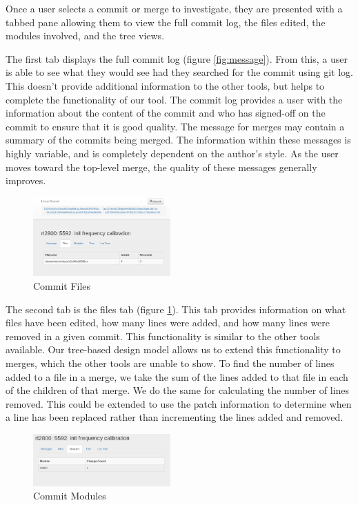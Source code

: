 \documentclass[conference, draftclsnofoot, draft]{IEEEtran}
\begin{document}
Once a user selects a commit or merge to investigate, they are presented with a
tabbed pane allowing them to view the full commit log, the files edited, the modules
involved, and the tree views.

The first tab displays the full commit log (figure \ref{fig:message}). From this, a
user is able to see what they would see had they searched for the commit using git
log. This doesn't provide additional information to the other tools, but helps to
complete the functionality of our tool. The commit log provides a user with the
information about the content of the commit and who has signed-off on the commit to
ensure that it is good quality. The message for merges may contain a summary of the
commits being merged.  The information within these messages is highly variable, and
is completely dependent on the author's style. As the user moves toward the
top-level merge, the quality of these messages generally improves.

\begin{figure}
        \centering
        \includegraphics[width=0.47\textwidth]{figures/file_view.png}
        \caption{Commit Files}
        \label{fig:files}
\end{figure}

The second tab is the files tab (figure \ref{fig:files}). This tab provides
information on what files have been edited, how many lines were added, and how many
lines were removed in a given commit. This functionality is similar to the other
tools available. Our tree-based design model allows us to extend this functionality
to merges, which the other tools are unable to show. To find the number of lines
added to a file in a merge, we take the sum of the lines added to that file in each
of the children of that merge. We do the same for calculating the number of lines
removed. This could be extended to use the patch information to determine when a
line has been replaced rather than incrementing the lines added and removed.

\begin{figure}
        \centering
        \includegraphics[width=0.47\textwidth]{figures/modules.png}
        \caption{Commit Modules}
        \label{fig:modules}
\end{figure}
\end{document}
